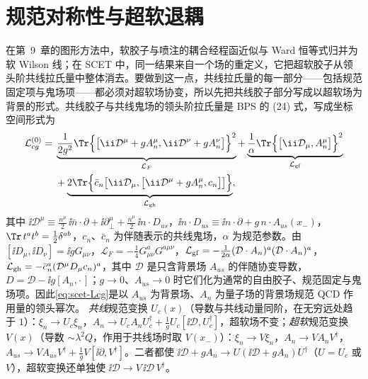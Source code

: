 \section{规范对称性与超软退耦}\label{sec:scet-decoupling}

在第~9~章的图形方法中，软胶子与喷注的耦合经程函近似与 Ward 恒等式归并为软 Wilson 线；在 SCET 中，同一结果来自一个场的重定义，它把超软胶子从领头阶共线拉氏量中整体消去。要做到这一点，共线拉氏量的每一部分——包括规范固定项与鬼场项——都必须对超软场协变，所以先把共线胶子部分写成以超软场为背景的形式。共线胶子与共线鬼场的领头阶拉氏量是 BPS 的 (24) 式\cite{BauerPirjolStewart2002}，写成坐标空间形式为
\begin{equation}\label{eq:scet-Lcg}
\begin{split}
\mathcal L^{(0)}_{cg}={}&\underbrace{\frac{1}{2g^2}\Tr\Big\{\big[\ii\mathcal D^\mu+gA_n^\mu,\ii\mathcal D^\nu+gA_n^\nu\big]\Big\}^2}_{\mathcal L_F}
+\underbrace{\frac1\alpha\Tr\Big\{\big[\ii\mathcal D_\mu,A_n^\mu\big]\Big\}^2}_{\mathcal L_{\rm gf}}\\
&+\underbrace{2\Tr\Big\{\bar c_n\big[\ii\mathcal D_\mu,\big[\ii\mathcal D^\mu+gA_n^\mu,c_n\big]\big]\Big\}}_{\mathcal L_{\rm gh}},
\end{split}
\end{equation}
其中 $\ii\mathcal D^\mu\equiv\frac{n^\mu}{2}\,\ii\bar n\cdot\partial+\ii\partial_\perp^\mu+\frac{\bar n^\mu}{2}\,\ii n\cdot D_{us}$，$\ii n\cdot D_{us}\equiv\ii n\cdot\partial+g\,n\cdot A_{us}(x_-)$，$\Tr\,t^at^b=\frac12\delta^{ab}$，$c_n$、$\bar c_n$ 为伴随表示的共线鬼场，$\alpha$ 为规范参数。由 $[\ii D_\mu,\ii D_\nu]=\ii gG_{\mu\nu}$，$\mathcal L_F=-\frac14G^a_{\mu\nu}G^{a\mu\nu}$，$\mathcal L_{\rm gf}=-\frac{1}{2\alpha}(\mathcal D\cdot A_n)^a(\mathcal D\cdot A_n)^a$，$\mathcal L_{\rm gh}=-\bar c_n^a(\mathcal D^\mu D_{\mu}c_n)^a$，其中 $\mathcal D$ 是只含背景场 $A_{us}$ 的伴随协变导数，$D=\mathcal D-\ii g[A_n,\cdot\,]$；$g\to0$、$A_{us}\to0$ 时它们化为通常的自由胶子、规范固定与鬼场项。因此\cref{eq:scet-Lcg}是以 $A_{us}$ 为背景场、$A_n$ 为量子场的背景场规范 QCD 作用量的领头幂次\cite{BauerPirjolStewart2002}。%
\emph{共线}规范变换 $U_c(x)$（导数与共线动量同阶，在无穷远处趋于 $1$）：$\xi_n\to U_c\xi_n$，$A_n\to U_cA_nU_c^\dagger+\frac1gU_c[\ii\mathcal D,U_c^\dagger]$，超软场不变；\emph{超软}规范变换 $V(x)$（导数 $\sim\lambda^2Q$，作用于共线场时取 $V(x_-)$）：$\xi_n\to V\xi_n$，$A_n\to VA_nV^\dagger$，$A_{us}\to VA_{us}V^\dagger+\frac1gV[\ii\partial,V^\dagger]$。二者都使 $\ii\mathcal D+gA_n\to U(\ii\mathcal D+gA_n)U^\dagger$（$U=U_c$ 或 $V$），超软变换还单独使 $\ii\mathcal D\to V\,\ii\mathcal D\,V^\dagger$。

